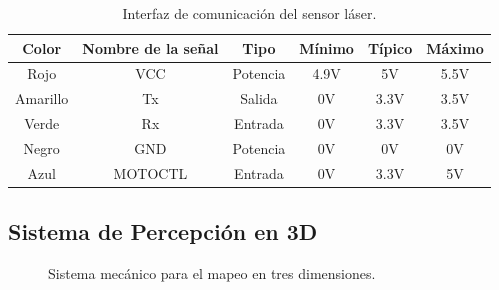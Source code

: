 \begin{table}[htbp]
\begin{center}
\begin{tabular}{|c|c|c|c|c|c|}
	\hline
	Color & Nombre de la se\~nal & Tipo & M\'inimo & T\'ipico & M\'aximo \\ 
	\hline \hline
	Rojo & VCC & Potencia & 4.9V & 5V & 5.5V \\ \hline
	Amarillo & Tx & Salida & 0V & 3.3V & 3.5V \\ \hline
	Verde & Rx & Entrada & 0V & 3.3V & 3.5V \\ \hline
	Negro & GND & Potencia & 0V & 0V & 0V \\ \hline
	Azul & MOTOCTL & Entrada & 0V & 3.3V & 5V \\ \hline
\end{tabular}
	\caption{Interfaz de comunicaci\'on del sensor l\'aser.}
	\label{tbl:comunicacion}
\end{center}
\end{table}


\subsection{Sistema de Percepci\'on en 3D}
\label{sec:SistP3D}
\begin{figure}[ht!]
     \begin{center}
    \end{center}
  \captionsetup{font=footnotesize}
    \caption{\label{f:lidar3D}Sistema mec\'anico para el mapeo en tres dimensiones.}
\end{figure}


